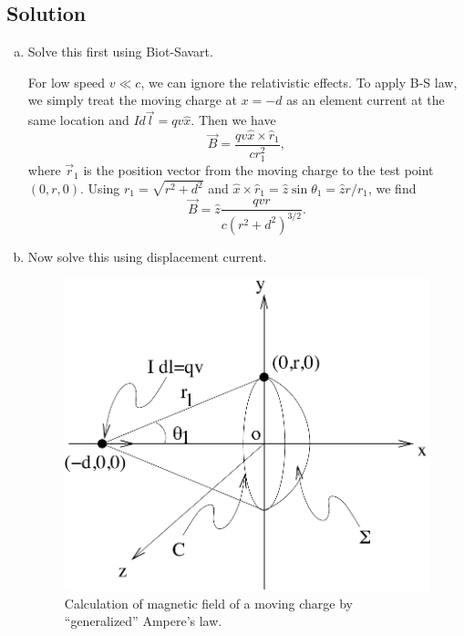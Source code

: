 \documentclass[solutions]{esg8022pset}
\begin{document}
\subsection{Solution}
  \begin{enumerate}[(a)]
    \item Solve this first using Biot-Savart.

      For low speed $v\ll c$, we can ignore the relativistic effects.  To
      apply B-S law, we simply treat the moving charge at $x=-d$ as an
      element current at the same location and $I d\vec{l}=qv\hat{x}$.  Then
      we have
      \begin{equation}
      \vec{B}= \frac{qv\hat{x}\times\hat{r}_1}{cr_1^2},
      \end{equation}
      where $\vec{r}_1$ is the position vector from the moving charge to the
      test point $(0,r,0)$.  Using $r_1 = \sqrt{r^2 + d^2}$ and $\hat
      x\times\hat r_1 = \hat z\sin\theta_1 = \hat z r/r_1$, we find
      \begin{equation}
      \vec{B}= \hat{z}\frac{qvr}{c(r^2+d^2)^{3/2}}.
      \end{equation}
    \item Now solve this using displacement current.

      \begin{figure}[H]
        \centering
        \includegraphics[width = 15cm]{m6}
        \caption{Calculation of magnetic field of a moving charge by
          ``generalized'' Ampere's law.}
      \end{figure}


\end{enumerate}
\end{document}
